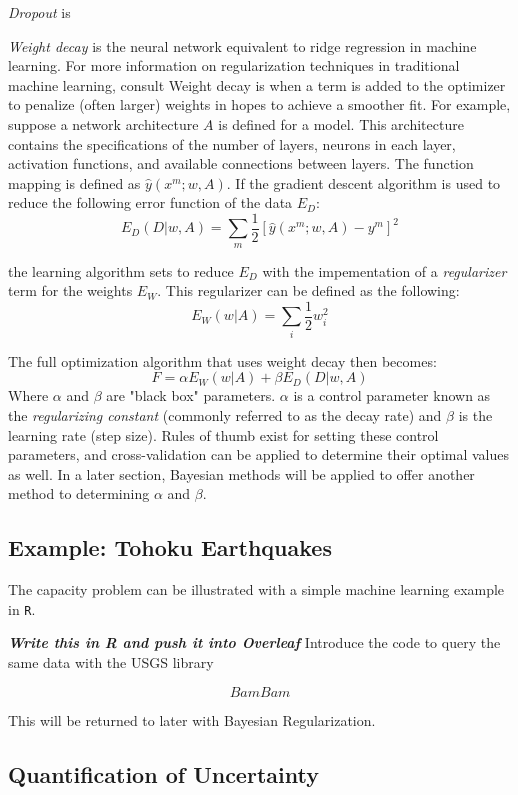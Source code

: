 \textit{Dropout} is \cite{srivastava2014dropout}

\textit{Weight decay} is the neural network equivalent to ridge regression in machine learning.  For more information on regularization techniques in traditional machine learning, consult \cite{Goodfellow-et-al-2016}  Weight decay is when a  term is added to the optimizer to penalize (often larger) weights in hopes to achieve a smoother fit. \cite{mackay1992practical}  For example, suppose a network architecture $A$ is defined for a model.  This architecture contains the specifications of the number of layers, neurons in each layer, activation functions, and available connections between layers.  The function mapping is defined as $\hat{y}(x^m;w,A)$.  If the gradient descent algorithm is used to reduce the following error function of the data $E_D$:
$$
E_D(D|w,A) = \sum_m \frac{1}{2} [\hat{y}(x^m;w,A) - y^m]^2
$$

the learning algorithm sets to reduce $E_D$ with the impementation of a \textit{regularizer} term for the weights $E_W$.  This regularizer can be defined as the following:
$$
E_W(w|A) = \sum_i \frac{1}{2} w_i^2
$$

The full optimization algorithm that uses weight decay then becomes:
$$
F = \alpha E_W(w|A) + \beta E_D(D|w,A)
$$
Where $\alpha$ and $\beta$ are "black box" parameters. \cite{mackay1992practical}  $\alpha$ is a control parameter known as the \textit{regularizing constant} (commonly referred to as the decay rate) and $\beta$ is the learning rate (step size).  Rules of thumb exist for setting these control parameters, and cross-validation can be applied to determine their optimal values as well.  In a later section, Bayesian methods will be applied to offer another method to determining $\alpha$ and $\beta$.


\subsection{Example: Tohoku Earthquakes}

The capacity problem can be illustrated with a simple machine learning example in \texttt{R}.

\textbf{\textit{Write this in R and push it into Overleaf}}
Introduce the code to query the same data with the USGS library

$$
Bam Bam
$$

This will be returned to later with Bayesian Regularization.

\subsection{Quantification of Uncertainty}


